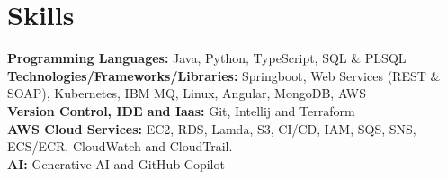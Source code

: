 \documentclass[letterpaper,10pt]{article}
\makeatletter
\newcommand{\resumeItem}[1]{
  \item\small{
    {#1 \vspace{-3pt}}
  }
}
\newcommand{\resumeSubheading}[4]{
  \vspace{-2pt}\item
    \begin{tabular*}{0.97\textwidth}[t]{l@{\extracolsep{\fill}}r}
      \textbf{#1} & #2 \\
      \textit{\small#3} & \textit{\small #4} \\
    \end{tabular*}\vspace{-7pt}
}
\newcommand{\resumeSubHeadingListStart}{\begin{itemize}[leftmargin=0.15in, label={}]}
\newcommand{\resumeSubHeadingListEnd}{\end{itemize}}
\newcommand{\resumeItemListStart}{\begin{itemize}}
\newcommand{\resumeItemListEnd}{\end{itemize}\vspace{-5pt}}
\makeatother
\begin{document}
%       
%         
%           
%           





\section{Skills}
  \vspace{3pt}
  \resumeSubHeadingListStart
    \small{\item{
        
        \textbf{Programming Languages:}{ Java, Python, TypeScript, SQL \& PLSQL} \\ \vspace{3pt}
        \textbf{Technologies/Frameworks/Libraries:}{ Springboot, Web Services (REST \& SOAP), Kubernetes, IBM MQ, Linux, Angular, MongoDB, AWS } \\ \vspace{3pt}
        \textbf{Version Control, IDE and Iaas:}{ Git, Intellij and Terraform } \\ \vspace{3pt}
        \textbf{AWS Cloud Services:}{ EC2, RDS, Lamda, S3, CI/CD, IAM, SQS, SNS, ECS/ECR, CloudWatch and CloudTrail. } \\ \vspace{3pt}
        \textbf{AI:}{ Generative AI and GitHub Copilot} \\ \vspace{3pt}
    }}
  \resumeSubHeadingListEnd
\end{document}
